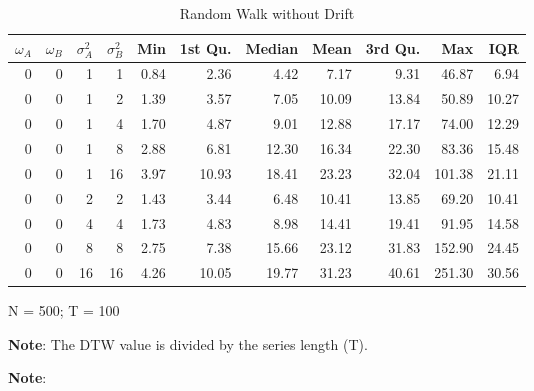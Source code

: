 \documentclass[12pt]{article}
\begin{document}
\begin{table}[!htb]
    \begin{center}
      \begin{tabular}{| r r r r | r r r r r r r |}
        \hline
        $\omega_{A}$ & $\omega_{B}$ & $\sigma^{2}_{A}$ & $\sigma^{2}_{B}$ & Min & 1st Qu. & Median & Mean & 3rd Qu. & Max & IQR \\
        \hline
        0 & 0 & 1  & 1  & 0.84 &  2.36 &  4.42 &  7.17 &  9.31 &  46.87 &  6.94  \\
        \hline
        0 & 0 & 1  & 2  & 1.39 &  3.57 &  7.05 & 10.09 & 13.84 &  50.89 & 10.27  \\
        0 & 0 & 1  & 4  & 1.70 &  4.87 &  9.01 & 12.88 & 17.17 &  74.00 & 12.29  \\
        0 & 0 & 1  & 8  & 2.88 &  6.81 & 12.30 & 16.34 & 22.30 &  83.36 & 15.48  \\
        0 & 0 & 1  & 16 & 3.97 & 10.93 & 18.41 & 23.23 & 32.04 & 101.38 & 21.11  \\
        \hline
        0 & 0 & 2  & 2  & 1.43 &  3.44 &  6.48 & 10.41 & 13.85 &  69.20 & 10.41  \\
        0 & 0 & 4  & 4  & 1.73 &  4.83 &  8.98 & 14.41 & 19.41 &  91.95 & 14.58  \\
        0 & 0 & 8  & 8  & 2.75 &  7.38 & 15.66 & 23.12 & 31.83 & 152.90 & 24.45  \\
        0 & 0 & 16 & 16 & 4.26 & 10.05 & 19.77 & 31.23 & 40.61 & 251.30 & 30.56  \\
        \hline
      \end{tabular}
    \caption{Random Walk without Drift}
    \end{center}
    \begin{tablenotes}
        \item{\footnotesize N = 500; T = 100}
        \item {\footnotesize \textbf{Note}: The DTW value is divided by the series length (T).}
        \item{\footnotesize \textbf{Note}: }
    \end{tablenotes}
    \label{tbl:dtw_random_walk_no_drift}
\end{table}
\end{document}
